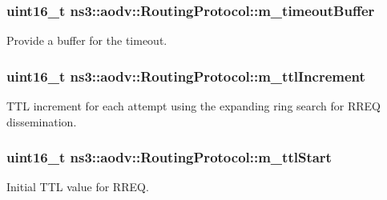\subsubsection[{\texorpdfstring{m\+\_\+timeout\+Buffer}{m_timeoutBuffer}}]{\setlength{\rightskip}{0pt plus 5cm}uint16\+\_\+t ns3\+::aodv\+::\+Routing\+Protocol\+::m\+\_\+timeout\+Buffer\hspace{0.3cm}{\ttfamily [private]}}\hypertarget{classns3_1_1aodv_1_1RoutingProtocol_a7805d2b1f8e48f3609f8770255a71e47}{}\label{classns3_1_1aodv_1_1RoutingProtocol_a7805d2b1f8e48f3609f8770255a71e47}


Provide a buffer for the timeout. 

\subsubsection[{\texorpdfstring{m\+\_\+ttl\+Increment}{m_ttlIncrement}}]{\setlength{\rightskip}{0pt plus 5cm}uint16\+\_\+t ns3\+::aodv\+::\+Routing\+Protocol\+::m\+\_\+ttl\+Increment\hspace{0.3cm}{\ttfamily [private]}}\hypertarget{classns3_1_1aodv_1_1RoutingProtocol_a7155a27e029832bfd90448bd6ae831db}{}\label{classns3_1_1aodv_1_1RoutingProtocol_a7155a27e029832bfd90448bd6ae831db}


T\+TL increment for each attempt using the expanding ring search for R\+R\+EQ dissemination. 

\subsubsection[{\texorpdfstring{m\+\_\+ttl\+Start}{m_ttlStart}}]{\setlength{\rightskip}{0pt plus 5cm}uint16\+\_\+t ns3\+::aodv\+::\+Routing\+Protocol\+::m\+\_\+ttl\+Start\hspace{0.3cm}{\ttfamily [private]}}\hypertarget{classns3_1_1aodv_1_1RoutingProtocol_abc9bab73b39d584866faf18e95704e0f}{}\label{classns3_1_1aodv_1_1RoutingProtocol_abc9bab73b39d584866faf18e95704e0f}


Initial T\+TL value for R\+R\+EQ. 

